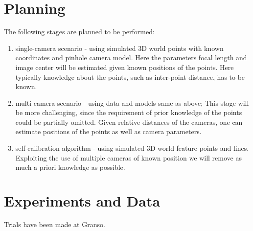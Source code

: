 \documentclass[12pt]{extarticle}
\begin{document}
\section{Planning}
The following stages are planned to be performed:
\begin{enumerate}
\item single-camera scenario - using simulated 3D world points with
  known coordinates and pinhole camera model. Here the parameters
  focal length and image center will be estimated given known
  positions of the points. Here typically knowledge about the points,
  such as inter-point distance, has to be known.
\item multi-camera scenario - using data and models same as above;
  This stage will be more challenging, since the requirement of prior
  knowledge of the points could be partially omitted. Given relative
  distances of the cameras, one can estimate positions of the points
  as well as camera parameters.
\item self-calibration algorithm -  using simulated 3D world feature
  points and lines. Exploiting the use of multiple cameras of known
  position we will remove as much a priori knowledge as possible.

\end{enumerate}

\section{Experiments and Data}

Trials have been made at Granso.



\end{document}
